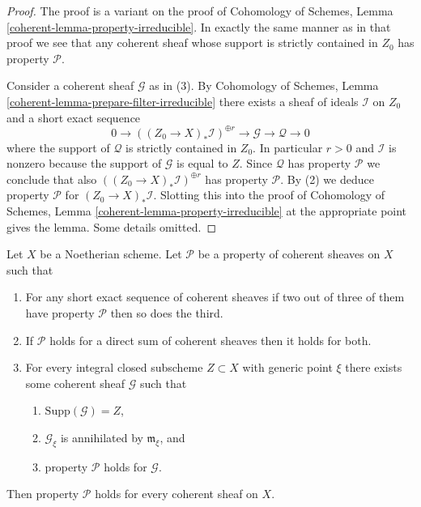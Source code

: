 \begin{proof}
The proof is a variant on the proof of
Cohomology of Schemes, Lemma \ref{coherent-lemma-property-irreducible}.
In exactly the same manner as in that proof we see that
any coherent sheaf whose support is strictly contained in $Z_0$
has property $\mathcal{P}$.

\medskip\noindent
Consider a coherent sheaf $\mathcal{G}$ as in (3).
By Cohomology of Schemes, Lemma \ref{coherent-lemma-prepare-filter-irreducible}
there exists a sheaf of ideals $\mathcal{I}$ on $Z_0$ and
a short exact sequence
$$
0 \to
\left((Z_0 \to X)_*\mathcal{I}\right)^{\oplus r} \to
\mathcal{G} \to
\mathcal{Q} \to 0
$$
where the support of $\mathcal{Q}$ is strictly contained in $Z_0$.
In particular $r > 0$ and $\mathcal{I}$ is nonzero
because the support of $\mathcal{G}$ is equal to $Z$.
Since $\mathcal{Q}$ has property $\mathcal{P}$ we conclude that
also $\left((Z_0 \to X)_*\mathcal{I}\right)^{\oplus r}$
has property $\mathcal{P}$.
By (2) we deduce property $\mathcal{P}$ for
$(Z_0 \to X)_*\mathcal{I}$. Slotting this into the proof of
Cohomology of Schemes, Lemma \ref{coherent-lemma-property-irreducible}
at the appropriate point gives the lemma.
Some details omitted.
\end{proof}

\begin{lemma}
\label{lemma-property-higher-rank}
Let $X$ be a Noetherian scheme.
Let $\mathcal{P}$ be a property of coherent sheaves on $X$ such that
\begin{enumerate}
\item For any short exact sequence of coherent sheaves if two
out of three of them have property $\mathcal{P}$ then so does the
third.
\item If $\mathcal{P}$ holds for a direct sum of coherent sheaves
then it holds for both.
\item For every integral closed subscheme $Z \subset X$
with generic point $\xi$ there exists
some coherent sheaf $\mathcal{G}$ such that
\begin{enumerate}
\item $\text{Supp}(\mathcal{G}) = Z$,
\item $\mathcal{G}_\xi$ is annihilated by $\mathfrak m_\xi$, and
\item property $\mathcal{P}$ holds for $\mathcal{G}$.
\end{enumerate}
\end{enumerate}
Then property $\mathcal{P}$ holds for every coherent sheaf
on $X$.
\end{lemma}

